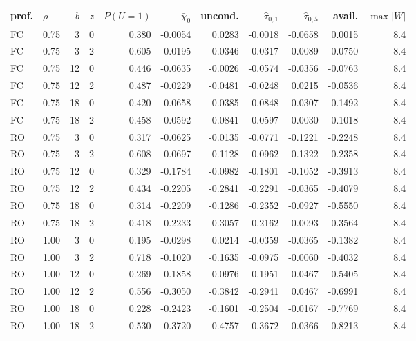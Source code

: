\begin{tabular}{llrr rrr rr rr}
\toprule
prof. & $\rho$ & $b$ & $z$ & $P(U{=}1)$ & $\bar\chi_0$ & uncond. & $\hat\tau_{0,1}$ & $\hat\tau_{0,5}$ & avail. & $\max|W|$ \\
\midrule
FC & 0.75 & 3 & 0 & 0.380 & -0.0054 & 0.0283 & -0.0018 & -0.0658 & 0.0015 & 8.4 \\
FC & 0.75 & 3 & 2 & 0.605 & -0.0195 & -0.0346 & -0.0317 & -0.0089 & -0.0750 & 8.4 \\
FC & 0.75 & 12 & 0 & 0.446 & -0.0635 & -0.0026 & -0.0574 & -0.0356 & -0.0763 & 8.4 \\
FC & 0.75 & 12 & 2 & 0.487 & -0.0229 & -0.0481 & -0.0248 & 0.0215 & -0.0536 & 8.4 \\
FC & 0.75 & 18 & 0 & 0.420 & -0.0658 & -0.0385 & -0.0848 & -0.0307 & -0.1492 & 8.4 \\
FC & 0.75 & 18 & 2 & 0.458 & -0.0592 & -0.0841 & -0.0597 & 0.0030 & -0.1018 & 8.4 \\
RO & 0.75 & 3 & 0 & 0.317 & -0.0625 & -0.0135 & -0.0771 & -0.1221 & -0.2248 & 8.4 \\
RO & 0.75 & 3 & 2 & 0.608 & -0.0697 & -0.1128 & -0.0962 & -0.1322 & -0.2358 & 8.4 \\
RO & 0.75 & 12 & 0 & 0.329 & -0.1784 & -0.0982 & -0.1801 & -0.1052 & -0.3913 & 8.4 \\
RO & 0.75 & 12 & 2 & 0.434 & -0.2205 & -0.2841 & -0.2291 & -0.0365 & -0.4079 & 8.4 \\
RO & 0.75 & 18 & 0 & 0.314 & -0.2209 & -0.1286 & -0.2352 & -0.0927 & -0.5550 & 8.4 \\
RO & 0.75 & 18 & 2 & 0.418 & -0.2233 & -0.3057 & -0.2162 & -0.0093 & -0.3564 & 8.4 \\
RO & 1.00 & 3 & 0 & 0.195 & -0.0298 & 0.0214 & -0.0359 & -0.0365 & -0.1382 & 8.4 \\
RO & 1.00 & 3 & 2 & 0.718 & -0.1020 & -0.1635 & -0.0975 & -0.0060 & -0.4032 & 8.4 \\
RO & 1.00 & 12 & 0 & 0.269 & -0.1858 & -0.0976 & -0.1951 & -0.0467 & -0.5405 & 8.4 \\
RO & 1.00 & 12 & 2 & 0.556 & -0.3050 & -0.3842 & -0.2941 & 0.0467 & -0.6991 & 8.4 \\
RO & 1.00 & 18 & 0 & 0.228 & -0.2423 & -0.1601 & -0.2504 & -0.0167 & -0.7769 & 8.4 \\
RO & 1.00 & 18 & 2 & 0.530 & -0.3720 & -0.4757 & -0.3672 & 0.0366 & -0.8213 & 8.4 \\
\bottomrule
\end{tabular}